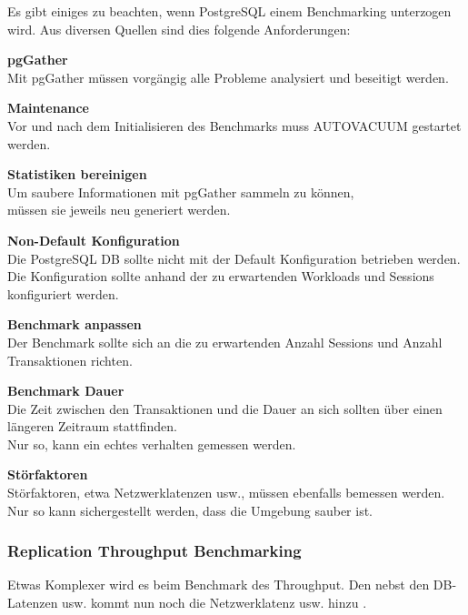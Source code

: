 \begin{flushleft}
    Es gibt einiges zu beachten, wenn PostgreSQL einem Benchmarking unterzogen wird.
    Aus diversen Quellen \cite{768DXXJK, 67TNVGTX, T3VEV98H, VXNYQFTE} sind dies folgende Anforderungen:
     \begin{description}
        \item \textbf{pgGather}\hfill \\Mit pgGather \cite{FGL8E2X5} müssen vorgängig alle Probleme analysiert und beseitigt werden.
        \item \textbf{Maintenance}\hfill \\Vor und nach dem Initialisieren des Benchmarks muss \Gls{AUTOVACUUM} gestartet werden.
        \item \textbf{Statistiken bereinigen}\hfill \\Um saubere Informationen mit pgGather sammeln zu können,\\müssen sie jeweils neu generiert werden.
        \item \textbf{Non-Default Konfiguration}\hfill \\Die PostgreSQL DB sollte nicht mit der Default Konfiguration betrieben werden.\\Die Konfiguration sollte anhand der zu erwartenden Workloads und Sessions konfiguriert werden.
        \item \textbf{Benchmark anpassen}\hfill \\Der Benchmark sollte sich an die zu erwartenden Anzahl Sessions und Anzahl \Gls{Transaktion}en richten.
        \item \textbf{Benchmark Dauer}\hfill \\Die Zeit zwischen den \Gls{Transaktion}en und die Dauer an sich sollten über einen längeren Zeitraum stattfinden.\\Nur so, kann ein echtes verhalten gemessen werden.
        \item \textbf{Störfaktoren}\hfill \\Störfaktoren, etwa Netzwerklatenzen \cite{5VBTYNB7} usw.,
        müssen ebenfalls bemessen werden.\\Nur so kann sichergestellt werden, dass die Umgebung sauber ist.
    \end{description}
\end{flushleft}
\begin{flushleft}
    \subsubsection{Replication Throughput Benchmarking}
    Etwas Komplexer wird es beim Benchmark des Throughput.
    Den nebst den DB-Latenzen usw. kommt nun noch die Netzwerklatenz usw. hinzu \cite{UU5X5NID}.

\end{flushleft}